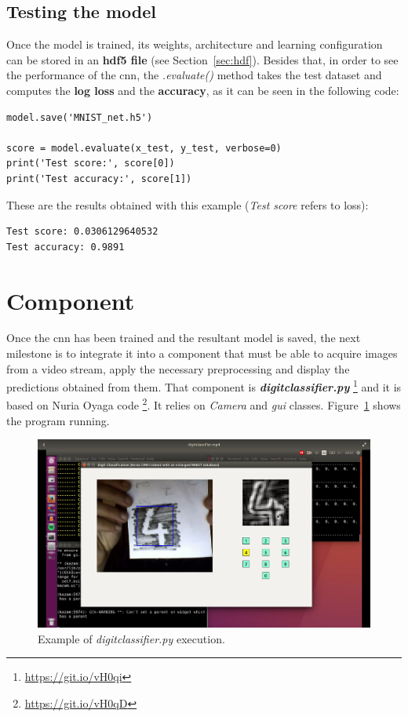 \subsection{Testing the model}
Once the model is trained, its weights, architecture and learning configuration can be stored in an \textbf{\gls{hdf5} file} (see Section~\ref{sec:hdf}). Besides that, in order to see the performance of the \gls{cnn}, the \textit{.evaluate()} method takes the test dataset and computes the \textbf{log loss} and the \textbf{accuracy}, as it can be seen in the following code:
\begin{lstlisting}
model.save('MNIST_net.h5')

score = model.evaluate(x_test, y_test, verbose=0)
print('Test score:', score[0])
print('Test accuracy:', score[1])
\end{lstlisting}
These are the results obtained with this example (\textit{Test score} refers to loss):
\begin{Verbatim}[frame=single]
Test score: 0.0306129640532
Test accuracy: 0.9891
\end{Verbatim}

\section{Component}\label{sec:component}
Once the \gls{cnn} has been trained and the resultant model is saved, the next milestone is to integrate it into a component that must be able to acquire images from a video stream, apply the necessary preprocessing and display the predictions obtained from them. That component is \textbf{\textit{digitclassifier.py}} \footnote{\url{https://git.io/vH0qi}} and it is based on Nuria Oyaga code \footnote{\url{https://git.io/vH0qD}}. It relies on \textit{Camera} and \textit{\gls{gui}} classes. Figure~\ref{fig:digitclass} shows the program running.

\begin{figure}
	\centering
	\includegraphics[width=1\linewidth, keepaspectratio]{figures/digitclass.png}
	\caption{Example of \textit{digitclassifier.py} execution.}
	\label{fig:digitclass}
\end{figure}

